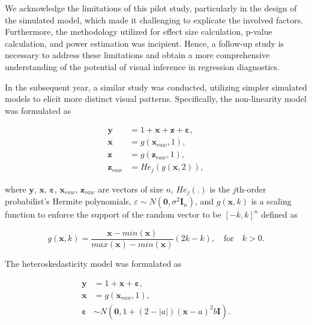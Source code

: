 \documentclass[11pt,a4paper,]{article}
\begin{document}
We acknowledge the limitations of this pilot study, particularly in the design of the simulated model, which made it challenging to explicate the involved factors. Furthermore, the methodology utilized for effect size calculation, p-value calculation, and power estimation was incipient. Hence, a follow-up study is necessary to address these limitations and obtain a more comprehensive understanding of the potential of visual inference in regression diagnostics.

In the subsequent year, a similar study was conducted, utilizing simpler simulated models to elicit more distinct visual patterns. Specifically, the non-linearity model was formulated as

\begin{align} \label{eq:nonlinearity-model}
\boldsymbol{y} &= 1 + \boldsymbol{x} + \boldsymbol{z} + \boldsymbol{\varepsilon},\\
\boldsymbol{x} &= g(\boldsymbol{x}_{raw}, 1), \\
\boldsymbol{z} &= g(\boldsymbol{z}_{raw}, 1), \\
\boldsymbol{z}_{raw} &= He_j(g(\boldsymbol{x}, 2)),
\end{align}

\noindent where \(\boldsymbol{y}\), \(\boldsymbol{x}\), \(\boldsymbol{\varepsilon}\), \(\boldsymbol{x}_{raw}\), \(\boldsymbol{z}_{raw}\) are vectors of size \(n\), \(He_{j}(.)\) is the \(j\)th-order probabilist's Hermite polynomials, \(\varepsilon \sim N(\boldsymbol{0}, \sigma^2\boldsymbol{I}_n)\), and \(g(\boldsymbol{x}, k)\) is a scaling function to enforce the support of the random vector to be \([-k, k]^n\) defined as

\begin{equation} \label{eq:scaling-function}
g(\boldsymbol{x}, k) = \frac{\boldsymbol{x} - min(\boldsymbol{x})}{max(\boldsymbol{x}) - min(\boldsymbol{x})}(2k - k), \quad \text{for} \quad k > 0. 
\end{equation}

The heteroskedasticity model was formulated as

\begin{align} \label{eq:heter-model}
\boldsymbol{y} &= 1 + \boldsymbol{x} + \boldsymbol{\varepsilon},\\
\boldsymbol{x} &= g(\boldsymbol{x}_{raw}, 1),\\
\boldsymbol{\varepsilon} &\sim N(\boldsymbol{0}, 1 + (2 - |a|)(\boldsymbol{x} - a)^2b \boldsymbol{I}). 
\end{align}
\end{document}
